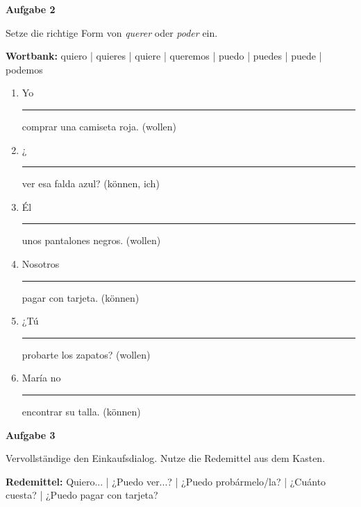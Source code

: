 \documentclass[11pt, a4paper]{article}
\newcommand{\fachfarbe}{spanisch}
\newcommand{\punktebox}[1]{\hfill\fbox{\small \_/#1}}
\newcommand{\luecke}[1]{\rule{#1}{0.4pt}}
\newenvironment{aufgabe}[1]{%
    \needspace{5\baselineskip}%
    \nopagebreak[4]%
    \vspace{10pt}
    \noindent\textbf{\textcolor{\fachfarbe}{Aufgabe #1}}
    \nopagebreak[4]%
    \vspace{5pt}
    \nopagebreak[4]%
    \begin{list}{}{\leftmargin=0pt}
    \item[]
}{%
    \end{list}
}
\begin{document}
\vspace{15pt}


\begin{aufgabe}{2}
Setze die richtige Form von \textit{querer} oder \textit{poder} ein. \punktebox{6}
\end{aufgabe}

\begin{hinweis}
\textbf{Wortbank:} quiero | quieres | quiere | queremos | puedo | puedes | puede | podemos
\end{hinweis}

\vspace{0.5em}

\begin{enumerate}[label=\alph*)]
    \item Yo \luecke{2.5cm} comprar una camiseta roja. (wollen)
    \item ¿\luecke{2.5cm} ver esa falda azul? (können, ich)
    \item Él \luecke{2.5cm} unos pantalones negros. (wollen)
    \item Nosotros \luecke{2.5cm} pagar con tarjeta. (können)
    \item ¿Tú \luecke{2.5cm} probarte los zapatos? (wollen)
    \item María no \luecke{2.5cm} encontrar su talla. (können)
\end{enumerate}

\vspace{15pt}


\begin{aufgabe}{3}
Vervollständige den Einkaufsdialog. Nutze die Redemittel aus dem Kasten. \punktebox{6}
\end{aufgabe}

\begin{hinweis}
\textbf{Redemittel:} Quiero... | ¿Puedo ver...? | ¿Puedo probármelo/la? | ¿Cuánto cuesta? | ¿Puedo pagar con tarjeta?
\end{hinweis}

\vspace{0.5em}
\end{document}
